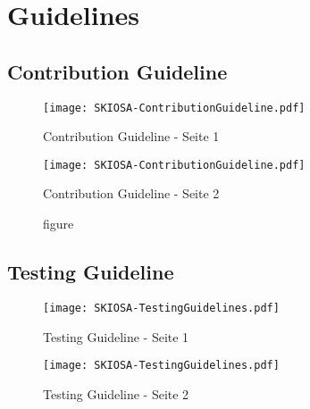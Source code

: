 \setpagestylefoot
\renewcommand{\thefigure}{A\arabic{figure}}
\renewcommand\thelstlisting{A\arabic{lstlisting}}
\renewcommand\thetable{A\arabic{table}}

\appendix
\renewcommand{\thesection}{\Alph{section}}
\renewcommand{\thesubsection}{\Alph{section}.\Alph{subsection}}



\ifliteratur
    \printbibliography[heading=bibintoc,title={Quellen}]
\fi


\addchap{\langanhang}

\section{Guidelines}
\subsection{Contribution Guideline} \label{contrib}
\begin{figure}[H]
    \texttt{[image: SKIOSA-ContributionGuideline.pdf]}
    \caption*{Contribution Guideline - Seite 1}
\end{figure}
\begin{figure}[H]
    \texttt{[image: SKIOSA-ContributionGuideline.pdf]}
    \caption*{figure}{Contribution Guideline - Seite 2}
\end{figure}

\subsection{Testing Guideline}
\begin{figure}[H]
    \texttt{[image: SKIOSA-TestingGuidelines.pdf]}
    \caption*{Testing Guideline - Seite 1}
\end{figure}
\begin{figure}[H]
    \texttt{[image: SKIOSA-TestingGuidelines.pdf]}
    \caption*{Testing Guideline - Seite 2}
\end{figure}

